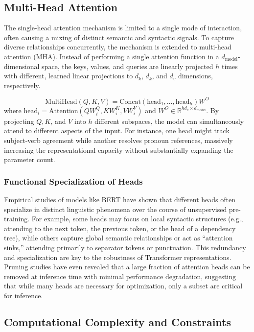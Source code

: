 \documentclass[11pt]{article}
\begin{document}
\subsection{Multi-Head Attention}

The single-head attention mechanism is limited to a single mode of interaction, often causing a mixing of distinct semantic and syntactic signals. To capture diverse relationships concurrently, the mechanism is extended to multi-head attention (MHA). Instead of performing a single attention function in a $d_{\text{model}}$-dimensional space, the keys, values, and queries are linearly projected $h$ times with different, learned linear projections to $d_k$, $d_k$, and $d_v$ dimensions, respectively.

\begin{equation}
  \text{MultiHead}(Q, K, V) = \text{Concat}(\text{head}_1, \ldots, \text{head}_h) W^O
\end{equation}
where $\text{head}_i = \text{Attention}(Q W_i^Q, K W_i^K, V W_i^V)$ and $W^O \in \mathbb{R}^{h d_v \times d_{\text{model}}}$. By projecting $Q, K$, and $V$ into $h$ different subspaces, the model can simultaneously attend to different aspects of the input. For instance, one head might track subject-verb agreement while another resolves pronoun references, massively increasing the representational capacity without substantially expanding the parameter count.

\subsubsection{Functional Specialization of Heads}
Empirical studies of models like BERT have shown that different heads often specialize in distinct linguistic phenomena over the course of unsupervised pre-training. For example, some heads may focus on local syntactic structures (e.g., attending to the next token, the previous token, or the head of a dependency tree), while others capture global semantic relationships or act as ``attention sinks,'' attending primarily to separator tokens or punctuation. This redundancy and specialization are key to the robustness of Transformer representations. Pruning studies have even revealed that a large fraction of attention heads can be removed at inference time with minimal performance degradation, suggesting that while many heads are necessary for optimization, only a subset are critical for inference.

\subsection{Computational Complexity and Constraints}
\end{document}

